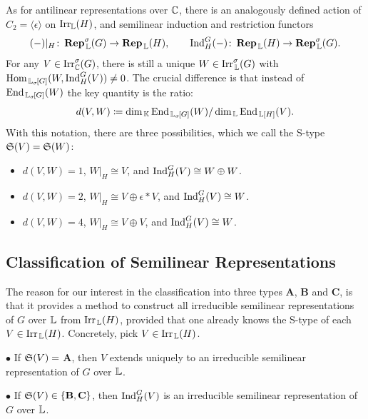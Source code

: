 As for antilinear representations over ${\mathbb C}$, there is an analogously defined action of $C_2 = \langle \epsilon \rangle$ on $\operatorname{Irr}_{{\mathbb L}}(H)$, and semilinear induction and restriction functors
\[
(-)|_H \colon \operatorname{\mathbf{Rep}}_{\, {\mathbb L}}^{\sigma}(G) \rightarrow \operatorname{\mathbf{Rep}}_{\, {\mathbb L}}(H), \qquad \operatorname{Ind}_H^G(-) \colon \operatorname{\mathbf{Rep}}_{\, {\mathbb L}}(H) \rightarrow \operatorname{\mathbf{Rep}}_{\, {\mathbb L}}^{\sigma}(G).
\]
For any $V \in \operatorname{Irr}_{{\mathbb C}}^{\sigma}(G)$, there is still a unique $W \in \operatorname{Irr}_{\, {\mathbb L}}^{\sigma}(G)$ with $\operatorname{Hom}_{\, {\mathbb L}_{\sigma}\hspace{-0.1em}[G]}(W, \operatorname{Ind}_H^G(V)) \neq 0$.
The crucial difference is that instead of $\operatorname{End}_{\, {\mathbb L}_{\sigma}\hspace{-0.1em}[G]}(W)$ the key quantity is the ratio:
\[
d(V,W) \coloneqq \dim_{\, {\mathbb K}}\operatorname{End}_{\, {\mathbb L}_{\sigma}\hspace{-0.1em}[G]}(W) / \dim_{\, {\mathbb L}}\operatorname{End}_{\, {\mathbb L}[H]}(V).
\]
With this notation, there are three possibilities, which we call the S-type ${\mathfrak S}(V) = {\mathfrak S}(W)$:
\begin{itemize}
    \item[(\textbf{A})] $d(V,W) = 1$, $W|_H \cong V$, and $\operatorname{Ind}_H^G(V) \cong W \oplus W$.
    \item[(\textbf{B})] $d(V,W) = 2$, $W|_H \cong V \oplus \epsilon * V$, and $\operatorname{Ind}_H^G(V) \cong W$.
    \item[(\textbf{C})] $d(V,W) = 4$, $W|_H \cong V \oplus V$, and $\operatorname{Ind}_H^G(V) \cong W$.
\end{itemize}

\subsection*{Classification of Semilinear Representations}
The reason for our interest in the classification into three types \textbf{A}, \textbf{B} and \textbf{C}, is that it provides a method to construct all irreducible semilinear representations of $G$ over ${\mathbb L}$ from $\operatorname{Irr}_{\, {\mathbb L}}(H)$, provided that one already knows the S-type of each $V \in \operatorname{Irr}_{\, {\mathbb L}}(H)$.
Concretely, pick $V \in \operatorname{Irr}_{\, {\mathbb L}}(H)$.

\vspace{0.2em}

\noindent \hspace{0.7em} $\bullet$ If ${\mathfrak S}(V)=$ \textbf{A}, then $V$ extends uniquely to an irreducible semilinear representation of $G$ over ${\mathbb L}$.

\noindent \hspace{0.7em} $\bullet$ If ${\mathfrak S}(V)\in\{\textbf{B},\textbf{C}\}$, then $\operatorname{Ind}_H^G(V)$ is an irreducible semilinear representation of $G$ over ${\mathbb L}$.

